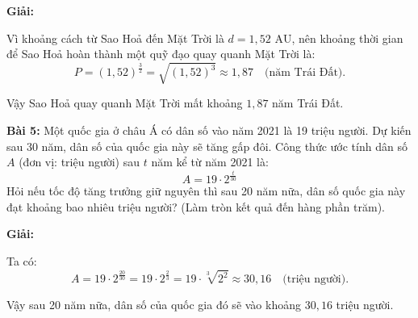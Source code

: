 \documentclass{article}
\begin{document}
\textbf{Giải:}

\noindent Vì khoảng cách từ Sao Hoả đến Mặt Trời là $d = 1,52\text{ AU}$, nên khoảng thời gian để Sao Hoả hoàn thành một quỹ đạo quay quanh Mặt Trời là:
\[
P = (1,52)^{\frac{3}{2}} = \sqrt{(1,52)^3} \approx 1,87 \quad \text{(năm Trái Đất)}.
\]

\noindent Vậy Sao Hoả quay quanh Mặt Trời mất khoảng $1,87$ năm Trái Đất.

\textbf{Bài 5:} Một quốc gia ở châu Á có dân số vào năm 2021 là 19 triệu người. Dự kiến sau 30 năm, dân số của quốc gia này sẽ tăng gấp đôi. Công thức ước tính dân số $A$ (đơn vị: triệu người) sau $t$ năm kể từ năm 2021 là:
\[
A = 19 \cdot 2^{\frac{t}{30}}
\]
Hỏi nếu tốc độ tăng trưởng giữ nguyên thì sau 20 năm nữa, dân số quốc gia này đạt khoảng bao nhiêu triệu người? (Làm tròn kết quả đến hàng phần trăm).

\vspace{0.3cm}

\textbf{Giải:}

\noindent Ta có:
\[
A = 19 \cdot 2^{\frac{20}{30}} = 19 \cdot 2^{\frac{2}{3}} = 19 \cdot \sqrt[3]{2^2} \approx 30,16 \quad \text{(triệu người)}.
\]

\noindent Vậy sau 20 năm nữa, dân số của quốc gia đó sẽ vào khoảng $30,16$ triệu người.
\newpage
\end{document}
